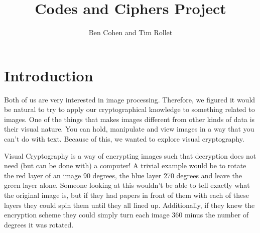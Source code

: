 \documentclass{article}
\title{Codes and Ciphers Project}
\author{Ben Cohen and Tim Rollet}
\begin{document}
\maketitle
\section*{Introduction}
\par Both of us are very interested in image processing.  Therefore, we figured it would be natural to try to apply our cryptographical knowledge to something related to images.  One of the things that makes images different from other kinds of data is their visual nature.  You can hold, manipulate and view images in a way that you can't do with text.  Because of this, we wanted to explore visual cryptography.  \\ 
\par Visual Cryptography is a way of encrypting images such that decryption does not need (but can be done with) a computer!  A trivial example would be to rotate the red layer of an image 90 degrees, the blue layer 270 degrees and leave the green layer alone.  Someone looking at this wouldn't be able to tell exactly what the original image is, but if they had papers in front of them with each of these layers they could spin them until they all lined up.  Additionally, if they knew the encryption scheme they could simply turn each image 360 minus the number of degrees it was rotated.  
\end{document}
